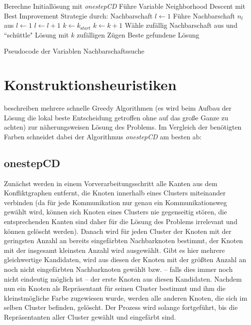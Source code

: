 \begin{algorithm}
\begin{algorithmic}[1]
\State Berechne Initiallösung mit \emph{onestepCD}
\State Führe Variable Neighborhood Descent mit Best Improvement Strategie durch:
\State Nachbarschaft $l \leftarrow 1$
\State Führe Nachbarschaft $n_l$ aus
\State  $l\leftarrow 1$  
\Else
\State  $l\leftarrow l + 1$
\EndIf
\EndWhile
{}
\State $k \leftarrow k_{\mathrm start}$ 
\Else
\State $k \leftarrow k + 1$
\EndIf
\State Wähle zufällig Nachbarschaft aus und ``schüttle" Lösung mit $k$ zufälligen Zügen
\EndWhile
\State\Return Beste gefundene Lösung
\end{algorithmic}
\caption{Pseudocode der Variablen Nachbarschaftssuche}
\end{algorithm}

\section{Konstruktionsheuristiken}
\label{sec:construct}
\citet*{Li2000} beschreiben mehrere schnelle Greedy Algorithmen (es wird beim Aufbau der Lösung die lokal beste Entscheidung getroffen ohne auf das große Ganze zu achten) zur näherungsweisen Lösung des Problems. Im Vergleich der benötigten Farben schneidet dabei der Algorithmus \emph{onestepCD} am besten ab:
\subsection{onestepCD}
Zunächst werden in einem Vorverarbeitungsschritt alle Kanten aus dem Konfliktgraphen entfernt, die Knoten innerhalb eines Clusters miteinander verbinden (da für jede Kommunikation nur genau ein Kommunikationsweg gewählt wird, können sich Knoten eines Clusters nie gegenseitig stören, die entsprechenden Kanten sind daher für die Lösung des Problems irrelevant und können gelöscht werden). Danach wird für jeden Cluster der Knoten mit der geringsten Anzahl an bereits eingefärbten Nachbarknoten bestimmt, der Knoten mit der insgesamt kleinsten Anzahl wird ausgewählt. Gibt es hier mehrere gleichwertige Kandidaten, wird aus diesen der Knoten mit der größten Anzahl an noch nicht eingefärbten Nachbarknoten gewählt bzw. -- falls dies immer noch nicht eindeutig möglich ist -- der erste Knoten aus diesen Kandidaten. Nachdem nun ein Knoten als Repräsentant für seinen Cluster bestimmt und ihm die klei\-nst\-mö\-gliche Farbe zugewiesen wurde, werden alle anderen Knoten, die sich im selben Cluster befinden, gelöscht. Der Prozess wird solange fortgeführt, bis die Repräsentanten aller Cluster gewählt und eingefärbt sind.

